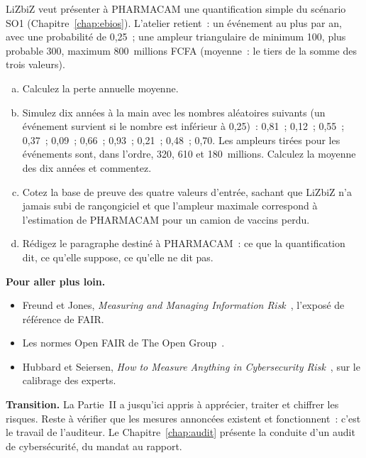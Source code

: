 \begin{boxexo}[title={\ding{45}\quad Exercice~5.4. Quantifier SO1 pour PHARMACAM \niveauexpert}]
LiZbiZ veut présenter à PHARMACAM une quantification simple du scénario
SO1 (Chapitre~\ref{chap:ebios}). L'atelier retient~: un événement au plus
par an, avec une probabilité de 0,25~; une ampleur triangulaire de minimum
100, plus probable 300, maximum 800~millions FCFA (moyenne~: le tiers de la
somme des trois valeurs).
\begin{enumerate}[(a)]
    \item Calculez la perte annuelle moyenne.
    \item Simulez dix années à la main avec les nombres aléatoires suivants
          (un événement survient si le nombre est inférieur à 0,25)~: 0,81~;
          0,12~; 0,55~; 0,37~; 0,09~; 0,66~; 0,93~; 0,21~; 0,48~; 0,70.
          Les ampleurs tirées pour les événements sont, dans l'ordre, 320,
          610 et 180~millions. Calculez la moyenne des dix années et
          commentez.
    \item Cotez la base de preuve des quatre valeurs d'entrée, sachant que
          LiZbiZ n'a jamais subi de rançongiciel et que l'ampleur
          maximale correspond à l'estimation de PHARMACAM pour un camion de
          vaccins perdu.
    \item Rédigez le paragraphe destiné à PHARMACAM~: ce que la
          quantification dit, ce qu'elle suppose, ce qu'elle ne dit pas.
\end{enumerate}
\end{boxexo}

\bigskip

\begin{boxinfo}
\textbf{Pour aller plus loin.}
\begin{itemize}
    \item Freund et Jones, \emph{Measuring and Managing Information
          Risk}~\cite{freund2015fair}, l'exposé de référence de FAIR.
    \item Les normes Open FAIR de The Open Group~\cite{opengroup2026openfair}.
    \item Hubbard et Seiersen, \emph{How to Measure Anything in
          Cybersecurity Risk}~\cite{hubbard2016measure}, sur le calibrage
          des experts.
\end{itemize}
\end{boxinfo}

\begin{boxinfo}
\textbf{Transition.} La Partie~II a jusqu'ici appris à apprécier, traiter
et chiffrer les risques. Reste à vérifier que les mesures annoncées
existent et fonctionnent~: c'est le travail de l'auditeur. Le
Chapitre~\ref{chap:audit} présente la conduite d'un audit de
cybersécurité, du mandat au rapport.
\end{boxinfo}
